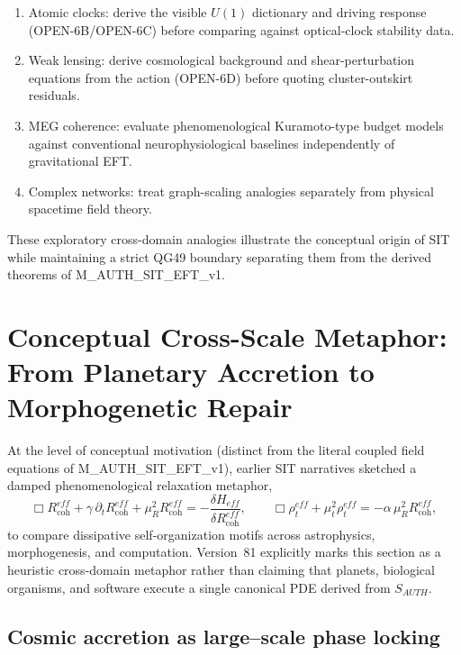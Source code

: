 \documentclass[american,11pt,letterpaper]{article}
\def\mathcal#1{#1}%
\def\mathrm#1{#1}%
\def\texttt#1{#1}%
\def\emph#1{#1}%
\begin{document}
\begin{enumerate}[label=\textbullet,leftmargin=1.8em]
\item \emph{Atomic clocks}: derive the visible $U(1)$ dictionary and driving response (\texttt{OPEN-6B}/\texttt{OPEN-6C}) before comparing against optical-clock stability data.  
\item \emph{Weak lensing}: derive cosmological background and shear-perturbation equations from the action (\texttt{OPEN-6D}) before quoting cluster-outskirt residuals.  
\item \emph{MEG coherence}: evaluate phenomenological Kuramoto-type budget models against conventional neurophysiological baselines independently of gravitational EFT.  
\item \emph{Complex networks}: treat graph-scaling analogies separately from physical spacetime field theory.
\end{enumerate}

These exploratory cross-domain analogies illustrate the conceptual origin of SIT while maintaining a strict \texttt{QG49} boundary separating them from the derived theorems of \texttt{M\_AUTH\_SIT\_EFT\_v1}.

\section{Conceptual Cross-Scale Metaphor: From Planetary Accretion to Morphogenetic Repair}
\label{sec:evolving-configuration}

At the level of conceptual motivation (distinct from the literal coupled field equations of \texttt{M\_AUTH\_SIT\_EFT\_v1}), earlier SIT narratives sketched a damped phenomenological relaxation metaphor,
\[
\Box R_{\text{coh}}^{\mathrm{eff}}+\gamma\,\partial_{t}R_{\text{coh}}^{\mathrm{eff}}+\mu_{R}^{2}R_{\text{coh}}^{\mathrm{eff}}=-\frac{\delta\mathcal{H}_{\mathrm{eff}}}{\delta R_{\text{coh}}^{\mathrm{eff}}},
\qquad
\Box\rho_{t}^{\mathrm{eff}}+\mu_{t}^{2}\rho_{t}^{\mathrm{eff}}=-\alpha\,\mu_{R}^{2}R_{\text{coh}}^{\mathrm{eff}},
\]
to compare dissipative self-organization motifs across astrophysics, morphogenesis, and computation. Version~81 explicitly marks this section as a heuristic cross-domain metaphor rather than claiming that planets, biological organisms, and software execute a single canonical PDE derived from $S_{\mathrm{AUTH}}$.

\subsection*{Cosmic accretion as large--scale phase locking}
\end{document}
